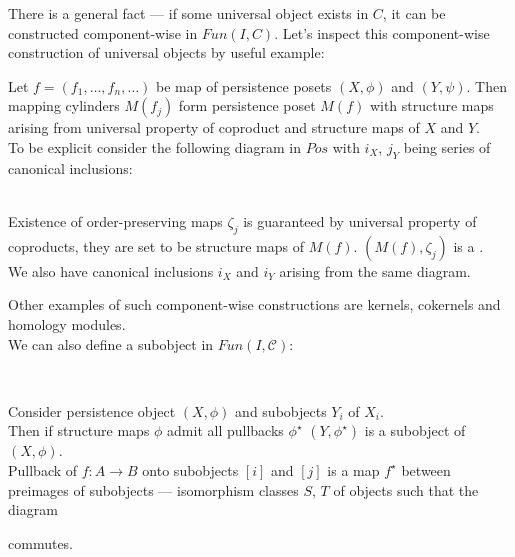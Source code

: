 There is a general fact --- if some universal object exists in $C$, it can be constructed component-wise in $Fun(I,C)$. Let's inspect this component-wise construction of universal objects by useful example:\\

\begin{definition}
  Let $f = (f_1,\ldots,f_n,\ldots)$ be map of persistence posets $(X, \phi)$ and $(Y, \psi)$. Then mapping cylinders $M(f_j)$ form persistence poset $M(f)$ with structure maps arising from universal property of coproduct and structure maps of $X$ and $Y$.\\

  To be explicit consider the following diagram in $Pos$ with $i_X$, $j_Y$ being series of canonical inclusions:\\
  \\

  Existence of order-preserving maps $\zeta_j$ is guaranteed by universal property of coproducts, they are set to be structure maps of $M(f)$. $(M(f), \zeta_j)$ is a .\\

  We also have canonical inclusions $i_X$ and $i_Y$ arising from the same diagram.
\end{definition}

Other examples of such component-wise constructions are kernels, cokernels and homology modules.\\

We can also define a subobject in $Fun(I, \mathcal{C})$:

\begin{definition} ~ \par
  Consider persistence object $(X,\phi)$ and subobjects $Y_i$ of $X_i$.\\

  Then if structure maps $\phi$ admit all pullbacks $\phi^{\star}$ $(Y,\phi^{\star})$ is a subobject of $(X, \phi)$.\\

  Pullback of $f : A \to B$ onto subobjects $[i]$ and $[j]$ is a map $f^{\star}$ between preimages of subobjects --- isomorphism classes $S$, $T$ of objects such that the diagram\\
  commutes.
\end{definition}

